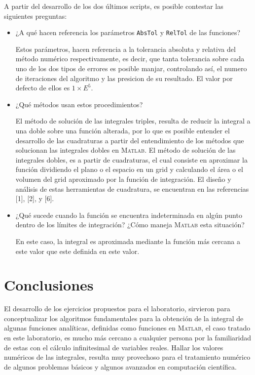\documentclass[11pt, spanish]{article}
\begin{document}
A partir del desarrollo de los dos últimos scripts, es posible contestar las siguientes preguntas:

\begin{itemize}
\item ¿A qué hacen referencia los parámetros \texttt{AbsTol} y \texttt{RelTol} de las funciones?

Estos parámetros, hacen referencia a la tolerancia absoluta y relativa del método numérico respectivamente, es decir, que tanta tolerancia sobre cada uno de los dos tipos de errores es posible manjar, controlando así, el numero de iteraciones del algoritmo y las presicion de su resultado. El valor por defecto de ellos es $1\times E^5$.

\item ¿Qué métodos usan estos procedimientos?

El método de solución de las integrales triples, resulta de reducir la integral a una doble sobre una función alterada, por lo que es posible entender el desarrollo de las cuadraturas a partir del entendimiento de los métodos que solucionan las integrales dobles en \textsc{Matlab}. El método de solución de las integrales dobles, es a partir de cuadraturas, el cual consiste en aproximar la función dividiendo el plano o el espacio en un grid y calculando el área o el volumen del grid aproximado por la función de integración. El diseño y análisis de estas herramientas de cuadratura, se encuentran en las referencias [1], [2], y [6]. 

\item ¿Qué sucede cuando la función se encuentra indeterminada en algún punto dentro de los límites de integración? ¿Cómo maneja \textsc{Matlab} esta situación?

En este caso, la integral es aproximada mediante la función más cercana a este valor que este definida en este valor.
\end{itemize}

\newpage

\section{Conclusiones}

El desarrollo de los ejercicios propuestos para el laboratorio, sirvieron para conceptualizar los algoritmos fundamentales para la obtención de la integral de algunas funciones analíticas, definidas como funciones en \textsc{Matlab}, el caso tratado en este laboratorio, es mucho más cercano a cualquier persona por la familiaridad de estas con el cálculo infinitesimal de variables reales. Hallar los valores numéricos de las integrales, resulta muy provechoso para el tratamiento numérico de algunos problemas básicos y algunos avanzados en computación científica.\\
\end{document}
